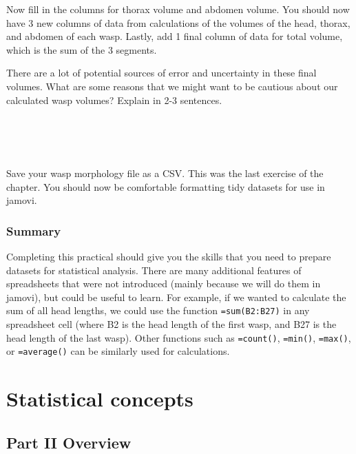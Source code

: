 \documentclass[
]{scrbook}
\begin{document}
Now fill in the columns for thorax volume and abdomen volume.
You should now have 3 new columns of data from calculations of the volumes of the head, thorax, and abdomen of each wasp.
Lastly, add 1 final column of data for total volume, which is the sum of the 3 segments.

There are a lot of potential sources of error and uncertainty in these final volumes.
What are some reasons that we might want to be cautious about our calculated wasp volumes?
Explain in 2-3 sentences.

\begin{verbatim}




\end{verbatim}

Save your wasp morphology file as a CSV.
This was the last exercise of the chapter.
You should now be comfortable formatting tidy datasets for use in jamovi.

\hypertarget{summary}{%
\section{Summary}\label{summary}}

Completing this practical should give you the skills that you need to prepare datasets for statistical analysis.
There are many additional features of spreadsheets that were not introduced (mainly because we will do them in jamovi), but could be useful to learn.
For example, if we wanted to calculate the sum of all head lengths, we could use the function \texttt{=sum(B2:B27)} in any spreadsheet cell (where B2 is the head length of the first wasp, and B27 is the head length of the last wasp).
Other functions such as \texttt{=count()}, \texttt{=min()}, \texttt{=max()}, or \texttt{=average()} can be similarly used for calculations.

\hypertarget{part-statistical-concepts}{%
\part{Statistical concepts}\label{part-statistical-concepts}}

\hypertarget{Week2}{%
\chapter*{Part II Overview}\label{Week2}}
\end{document}
